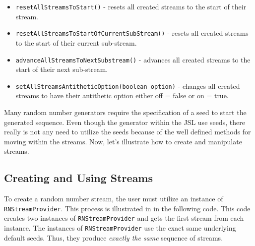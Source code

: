 \documentclass[
]{book}
\providecommand{\tightlist}{%
  \setlength{\itemsep}{0pt}\setlength{\parskip}{0pt}}
\theoremstyle{definition}
\theoremstyle{definition}
\theoremstyle{definition}
\theoremstyle{definition}
\theoremstyle{remark}
\begin{document}
\begin{itemize}
\tightlist
\item
  \texttt{resetAllStreamsToStart()} - resets all created streams to the start of their stream.
\item
  \texttt{resetAllStreamsToStartOfCurrentSubStream()} - resets all created streams to the start of their current sub-stream.
\item
  \texttt{advanceAllStreamsToNextSubstream()} - advances all created streams to the start of their next sub-stream.
\item
  \texttt{setAllStreamsAntitheticOption(boolean\ option)} - changes all created streams to have their antithetic option either off = false or on = true.
\end{itemize}

Many random number generators require the specification of a seed to start the generated sequence. Even though the generator within the JSL use seeds, there really is not any need to utilize the seeds because of the well defined methods for moving within the streams. Now, let's illustrate how to create and manipulate streams.

\hypertarget{ch2:creatingStreams}{%
\subsection{Creating and Using Streams}\label{ch2:creatingStreams}}

To create a random number stream, the user must utilize an instance of \texttt{RNStreamProvider}. This process is illustrated in in the following code. This code creates two instances of \texttt{RNStreamProvider} and gets the first stream from each instance. The instances of \texttt{RNStreamProvider} use the exact same underlying default seeds. Thus, they produce \emph{exactly the same} sequence of streams.
\end{document}
